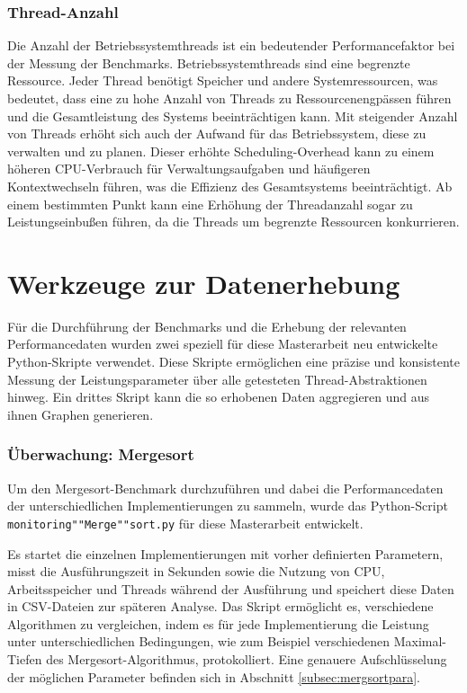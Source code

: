 \documentclass[fontsize=12pt,paper=a4,twoside=semi,parskip=half-,headsepline,headinclude]{scrreprt}
\begin{document}
\subsubsection{Thread-Anzahl}

Die Anzahl der Betriebssystemthreads ist ein bedeutender Performancefaktor bei der Messung der Benchmarks. Betriebssystemthreads sind eine begrenzte Ressource. Jeder Thread benötigt Speicher und andere Systemressourcen, was bedeutet, dass eine zu hohe Anzahl von Threads zu Ressourcenengpässen führen und die Gesamtleistung des Systems beeinträchtigen kann. Mit steigender Anzahl von Threads erhöht sich auch der Aufwand für das Betriebssystem, diese zu verwalten und zu planen. Dieser erhöhte Scheduling-Overhead kann zu einem höheren CPU-Verbrauch für Verwaltungsaufgaben und häufigeren Kontextwechseln führen, was die Effizienz des Gesamtsystems beeinträchtigt. Ab einem bestimmten Punkt kann eine Erhöhung der Threadanzahl sogar zu Leistungseinbußen führen, da die Threads um begrenzte Ressourcen konkurrieren.

\section{Werkzeuge zur Datenerhebung}

Für die Durchführung der Benchmarks und die Erhebung der relevanten Performance\-daten wurden zwei speziell für diese Masterarbeit neu entwickelte Python-Skripte verwendet. Diese Skripte ermöglichen eine präzise und konsistente Messung der Leistungsparameter über alle getesteten Thread-Abstraktionen hinweg. Ein drittes Skript kann die so erhobenen Daten aggregieren und aus ihnen Graphen generieren.

\subsubsection{Überwachung: Mergesort}

Um den Mergesort-Benchmark durchzuführen und dabei die Performancedaten der unterschiedlichen Implementierungen zu sammeln, wurde das Python-Script \texttt{monitoring""Merge""sort.py} für diese Masterarbeit entwickelt.

Es startet die einzelnen Implementierungen mit vorher definierten Parametern, misst die Ausführungszeit in Sekunden sowie die Nutzung von CPU, Arbeitsspeicher und Threads während der Ausführung und speichert diese Daten in CSV-Dateien zur späteren Analyse. Das Skript ermöglicht es, verschiedene Algorithmen zu vergleichen, indem es für jede Implementierung die Leistung unter unterschiedlichen Bedingungen, wie zum Beispiel verschiedenen Maximal-Tiefen des Mergesort-Algorithmus, protokolliert. Eine genauere Aufschlüsselung der möglichen Parameter befinden sich in Abschnitt \ref{subsec:mergsortpara}.
\end{document}

